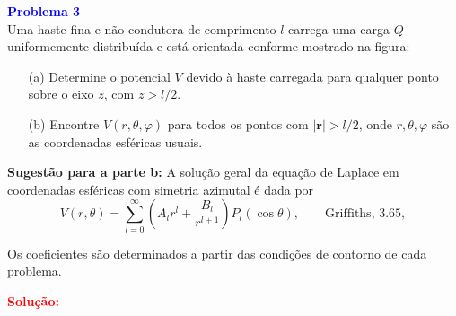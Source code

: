 \documentclass[a4paper,12pt]{article}
\begin{document}
\begin{flushleft}
\textbf{\textcolor{blue}{\Large Problema 3}}\\

Uma haste fina e não condutora de comprimento \( l \) carrega uma carga 
\( Q \) uniformemente distribuída e está orientada conforme mostrado na figura:

\begin{center}
\end{center}

\begin{enumerate}
    \item[(a)] Determine o potencial \( V \) devido à haste carregada para qualquer 
    ponto sobre o eixo \( z \), com \( z > l/2 \).

    \item[(b)] Encontre \( V(r, \theta, \varphi) \) para todos os pontos com \( |\mathbf{r}| > l/2 \), 
    onde \( r, \theta, \varphi \) são as coordenadas esféricas usuais.
\end{enumerate}

\textbf{Sugestão para a parte b:} A solução geral da equação de Laplace em coordenadas esféricas 
com simetria azimutal é dada por
\begin{equation}
V(r, \theta) = \sum_{l=0}^{\infty} \left( A_l r^l + \frac{B_l}{r^{l+1}} \right) P_l(\cos\theta),
\qquad \text{Griffiths, 3.65},
\end{equation}

Os \colorbox{green!15}{coeficientes são determinados a partir das condições de contorno de cada problema.}

\textcolor{red}{\textbf{Solução:}}\\


\end{flushleft}
\end{document}
